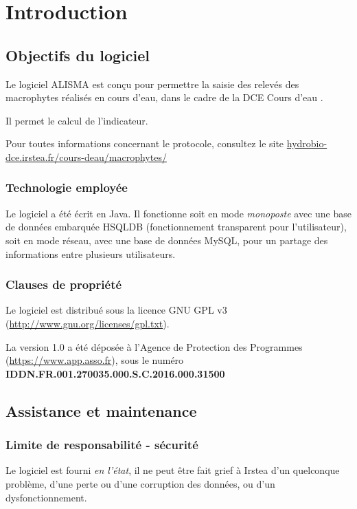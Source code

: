 \chapter{Introduction}

\section{Objectifs du logiciel}
Le logiciel ALISMA est conçu pour permettre la saisie des relevés des macrophytes réalisés en cours d'eau, dans le cadre de la DCE \og Cours d'eau \fg{}. 

Il permet le calcul de l'indicateur.

Pour toutes informations concernant le protocole, consultez le site \href{https://hydrobio-dce.irstea.fr/cours-deau/macrophytes/}{hydrobio-dce.irstea.fr/cours-deau/macrophytes/}

\subsection{Technologie employée}
Le logiciel a été écrit en Java. Il fonctionne soit en mode \textit{monoposte} avec une base de données embarquée HSQLDB (fonctionnement transparent pour l'utilisateur), soit en mode réseau, avec une base de données MySQL, pour un partage des informations entre plusieurs utilisateurs.

\subsection{Clauses de propriété}
Le logiciel est distribué sous la licence GNU GPL v3 (\url{http://www.gnu.org/licenses/gpl.txt}).

La version 1.0 a été déposée à l'Agence de Protection des Programmes (\url{https://www.app.asso.fr}), sous le numéro \textbf{IDDN.FR.001.270035.000.S.C.2016.000.31500}

\section{Assistance et maintenance}

\subsection{Limite de responsabilité - sécurité}

Le logiciel est fourni \textit{en l'état}, il ne peut être fait grief à Irstea d'un quelconque problème, d'une perte ou d'une corruption des données, ou d'un dysfonctionnement.

